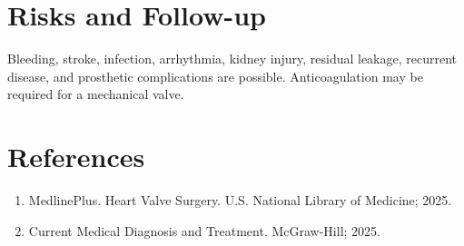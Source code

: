 \section*{Risks and Follow-up}
Bleeding, stroke, infection, arrhythmia, kidney injury, residual leakage, recurrent disease, and prosthetic complications are possible. Anticoagulation may be required for a mechanical valve.
\section*{References}
\begin{enumerate}\item MedlinePlus. Heart Valve Surgery. U.S. National Library of Medicine; 2025.\item Current Medical Diagnosis and Treatment. McGraw-Hill; 2025.\end{enumerate}
\clearpage
